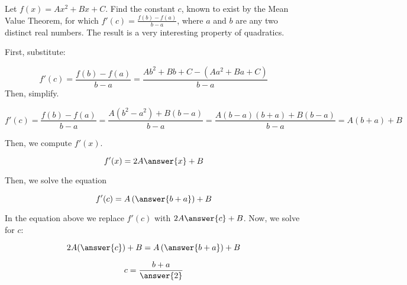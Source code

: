 \documentclass{ximera}
\author{Steven Gubkin\and Nela Lakos}
\begin{document}
\begin{exercise}

Let $f(x) = Ax^2+Bx+C$.  Find the constant $c$, known to exist by the Mean Value Theorem, for which $f'(c) = \frac{f(b)-f(a)}{b-a}$, where $a$ and $b$ are any two distinct real numbers.  The result is a very interesting property of quadratics.


\begin{hint}
First, substitute: 

\[
f'(c) = \frac{f(b)-f(a)}{b-a}=\frac{Ab^2+Bb+C-(Aa^2+Ba+C)}{b-a}
\]
Then, simplify.
\end{hint}


\begin{hint}
\[
f'(c) = \frac{f(b)-f(a)}{b-a}=\frac{A(b^2-a^2)+B(b-a)}{b-a}=\frac{A(b-a)(b+a)+B(b-a)}{b-a}=A(b+a)+B
\]
\end{hint}

\begin{hint}
Then, we compute $f'(x)$.

\[
f'(x) =2A\answer{x}+B 
\]
\end{hint}

\begin{hint}
Then, we solve the equation

\[
f'(c) =A\left(\answer{b+a}\right)+B
\]
\end{hint}

\begin{hint}
In the equation above we replace $f'(c)$ with $2A\answer{c}+B $. Now, we solve for $c$:

\[
2A(\answer{c})+B =A\left(\answer{b+a}\right)+B
\]
\end{hint}
\begin{prompt}
	$$c = \frac{b+a}{\answer{2}}$$
\end{prompt}

\end{exercise}
\end{document}
